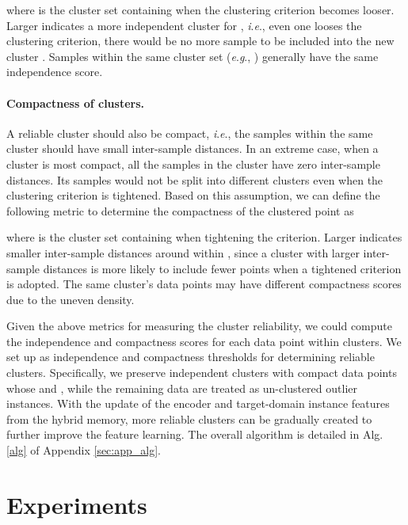 \documentclass{article}
\newcommand{\ie}{\textit{i}.\textit{e}., }
\newcommand{\eg}{\textit{e}.\textit{g}., }
\begin{document}
where 
 is the cluster set containing  when the clustering criterion becomes looser.
Larger  indicates a more independent cluster for , \ie even one looses the clustering criterion, there would be no more sample to be included into the new cluster .
Samples within the same cluster set (\eg ) generally have the same independence score.

\vspace{-5pt}
\paragraph{Compactness of clusters.}
A reliable cluster should also be {compact}, \ie the samples within the same cluster should have small inter-sample distances.
In an extreme case, when a cluster is most compact, all the samples in the cluster have zero inter-sample distances.
Its samples would not be split into different clusters even when the clustering criterion is tightened. 
Based on this assumption, we can define the following metric to determine the compactness of the clustered point  as

where  is the cluster set containing  when tightening the criterion.
Larger  indicates smaller inter-sample distances around  within , since a cluster with larger inter-sample distances is more likely to include fewer points when a tightened criterion is adopted. 
The same cluster's data points may have different compactness scores due to the uneven density.



Given the above metrics for measuring the cluster reliability,
we could compute the independence and compactness scores for each data point within clusters.
We set up  as independence and compactness thresholds for determining reliable clusters.
Specifically,
we preserve independent clusters with compact data points whose
 and ,
while the remaining data are treated as un-clustered outlier instances. 
With the update of the encoder  and target-domain instance features  from the hybrid memory,
more reliable clusters can be gradually created to further improve the feature learning. 
The overall algorithm is detailed in Alg. \ref{alg} of Appendix \ref{sec:app_alg}. 




\section{Experiments}
\vspace{-5pt}
\end{document}
